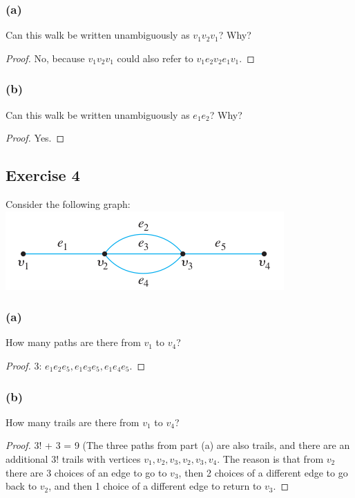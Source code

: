 \documentclass[14pt]{extarticle}
\begin{document}
\subsubsection{(a)}
Can this walk be written unambiguously as \(v_1v_2v_1\)? Why?
\begin{proof}
    No, because \(v_1v_2v_1\) could also refer to \(v_1e_2v_2e_1v_1\).
\end{proof}

\subsubsection{(b)}
Can this walk be written unambiguously as \(e_1e_2\)? Why?
\begin{proof}
    Yes.
\end{proof}

\subsection{Exercise 4}
Consider the following graph:
\includegraphics[scale=0.5]{../images/10.1.4.png}

\subsubsection{(a)}
How many paths are there from \(v_1\) to \(v_4\)?
\begin{proof}
    3: \(e_1e_2e_5, e_1e_3e_5, e_1e_4e_5\).
\end{proof}

\subsubsection{(b)}
How many trails are there from \(v_1\) to \(v_4\)?
\begin{proof}
    3! + 3 = 9 (The three paths from part (a) are also trails, and there are an additional 3! trails with vertices \(v_1, v_2,
    v_3, v_2, v_3, v_4\). The reason is that from \(v_2\) there are 3 choices of an edge to go to \(v_3\), then 2 choices of a
    different edge to go back to \(v_2\), and then 1 choice of a different edge to return to \(v_3\).
\end{proof}
\end{document}
